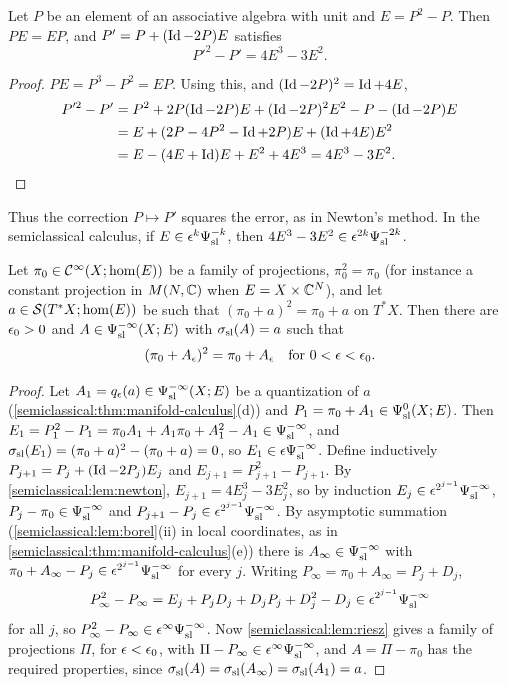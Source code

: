 \begin{lemma}\label{semiclassical:lem:newton}
  Let $P$ be an element of an associative algebra with unit and $E=P^2-P$. Then
  $PE=EP$, and $P'=P+(\operatorname{Id}-2P)E$ satisfies
  \begin{equation*}
    P'^2-P'=4E^3-3E^2.
  \end{equation*}
\end{lemma}
\begin{proof}
  $PE=P^3-P^2=EP$. Using this, and $(\operatorname{Id}-2P)^2=\operatorname{Id}+4E$,
  \begin{align*}
    P'^2-P'&=P^2+2P(\operatorname{Id}-2P)E+(\operatorname{Id}-2P)^2E^2-P-(\operatorname{Id}-2P)E\\
    &=E+(2P-4P^2-\operatorname{Id}+2P)E+(\operatorname{Id}+4E)E^2\\
    &=E-(4E+\operatorname{Id})E+E^2+4E^3=4E^3-3E^2 .\qedhere
  \end{align*}
\end{proof}

Thus the correction $P\mapsto P'$ squares the error, as in Newton's method. In
the semiclassical calculus, if $E\in\epsilon^k\Psi^{-k}_{\mathrm{sl}}$, then
$4E^3-3E^2\in\epsilon^{2k}\Psi^{-2k}_{\mathrm{sl}}$.

\begin{theorem}\label{semiclassical:thm:projection-smoothing}
  Let $\pi_0\in\mathcal{C}^\infty(X;\hom(E))$ be a family of projections, $\pi_0^2=\pi_0$
  (for instance a constant projection in $M(N,\mathbb{C})$ when $E=X\times\mathbb{C}^N$), and let
  $a\in\mathcal{S}(T^*X;\hom(E))$ be such that $(\pi_0+a)^2=\pi_0+a$ on $T^*X$. Then there
  are $\epsilon_0>0$ and $A\in\Psi^{-\infty}_{\mathrm{sl}}(X;E)$ with $\sigma_{\mathrm{sl}}(A)=a$ such that
  \begin{equation*}
    (\pi_0+A_\epsilon)^2=\pi_0+A_\epsilon\quad\text{for }0<\epsilon<\epsilon_0 .
  \end{equation*}
\end{theorem}
\begin{proof}
  Let $A_1=q_\epsilon(a)\in\Psi^{-\infty}_{\mathrm{sl}}(X;E)$ be a quantization of $a$
  (\cref{semiclassical:thm:manifold-calculus}(d)) and $P_1=\pi_0+A_1\in\Psi^{0}_{\mathrm{sl}}(X;E)$.
  Then $E_1=P_1^2-P_1=\pi_0A_1+A_1\pi_0+A_1^2-A_1\in\Psi^{-\infty}_{\mathrm{sl}}$, and
  $\sigma_{\mathrm{sl}}(E_1)=(\pi_0+a)^2-(\pi_0+a)=0$, so $E_1\in\epsilon\Psi^{-\infty}_{\mathrm{sl}}$. Define
  inductively $P_{j+1}=P_j+(\operatorname{Id}-2P_j)E_j$ and $E_{j+1}=P_{j+1}^2-P_{j+1}$. By
  \cref{semiclassical:lem:newton}, $E_{j+1}=4E_j^3-3E_j^2$, so by induction
  $E_j\in\epsilon^{2^{j-1}}\Psi^{-\infty}_{\mathrm{sl}}$, $P_j-\pi_0\in\Psi^{-\infty}_{\mathrm{sl}}$ and
  $P_{j+1}-P_j\in\epsilon^{2^{j-1}}\Psi^{-\infty}_{\mathrm{sl}}$. By asymptotic summation
  (\cref{semiclassical:lem:borel}(ii) in local coordinates, as in
  \cref{semiclassical:thm:manifold-calculus}(e)) there is $A_\infty\in\Psi^{-\infty}_{\mathrm{sl}}$
  with $\pi_0+A_\infty-P_j\in\epsilon^{2^{j-1}}\Psi^{-\infty}_{\mathrm{sl}}$ for every $j$. Writing
  $P_\infty=\pi_0+A_\infty=P_j+D_j$,
  \begin{equation*}
    P_\infty^2-P_\infty=E_j+P_jD_j+D_jP_j+D_j^2-D_j\in\epsilon^{2^{j-1}}\Psi^{-\infty}_{\mathrm{sl}}
  \end{equation*}
  for all $j$, so $P_\infty^2-P_\infty\in\epsilon^\infty\Psi^{-\infty}_{\mathrm{sl}}$. Now
  \cref{semiclassical:lem:riesz} gives a family of projections $\Pi$, for
  $\epsilon<\epsilon_0$, with $\Pi-P_\infty\in\epsilon^\infty\Psi^{-\infty}_{\mathrm{sl}}$, and $A=\Pi-\pi_0$ has
  the required properties, since $\sigma_{\mathrm{sl}}(A)=\sigma_{\mathrm{sl}}(A_\infty)=\sigma_{\mathrm{sl}}(A_1)=a$.
\end{proof}

